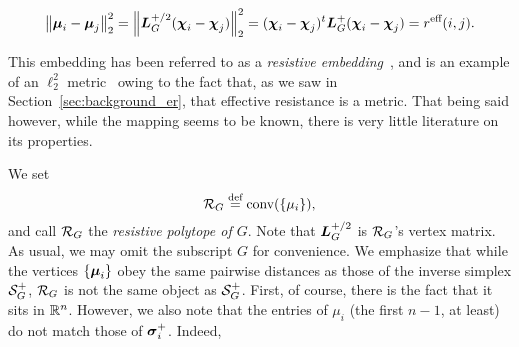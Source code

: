 \begin{equation*}
\norm{\vb*{\mu}_i-\vb*{\mu}_j}_2^2 = \norm{\vb*{L}_G^{+/2}(\boldsymbol{\chi}_i-\boldsymbol{\chi}_j)}_2^2 =  (\boldsymbol{\chi}_i-\boldsymbol{\chi}_j)^t \vb*{L}_G^+(\boldsymbol{\chi}_i-\boldsymbol{\chi}_j)=r^{\text{eff}}(i,j).
\end{equation*}

This embedding has been referred to as a \emph{resistive embedding}~\cite{shayanNotes,ding2011cover}, and is an example of an $\ell_2^2$ metric~\cite{arora2009expander} owing  to the fact that, as we saw in Section~\ref{sec:background_er},  that effective resistance is a metric. That being said however, while the mapping seems to be known, there is very little literature on its properties. 

We  set 
\begin{equation}
\label{eq:res_pol}
\mathcal{R}_G \overset{\text{def}}{=} \textnormal{conv}(\{\mu_i\}),
\end{equation}
and  call  $\mathcal{R}_G$ the \emph{resistive polytope of $G$}. Note that $\vb*{L}_G^{+/2}$ is $\mathcal{R}_G$'s vertex matrix. As usual, we may omit the subscript $G$ for convenience. We emphasize that while the vertices $\{\vb*{\mu}_i\}$ obey the same pairwise  distances as  those of the inverse simplex $\mathcal{S}_G^+$, $\mathcal{R}_G$  is not the same object as $\mathcal{S}_G^+$. First, of course, there is  the fact that it sits in  $\mathbb{R}^n$. However,  we also note that the entries of $\mu_i$ (the first $n-1$, at least) do not match those of $\vb*{\sigma}_i^+$. Indeed, 



